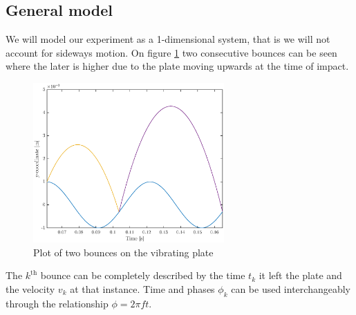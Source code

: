 \documentclass[12pt,oneside,a4paper]{article}
\numberwithin{equation}{section}
\begin{document}
{{{{\subsection{General model}
We will model our experiment as a 1-dimensional system, that is we will not 
account for sideways motion. On figure \ref{bounces} two consecutive bounces 
can be seen where the later is higher due to the plate  moving upwards at the 
time of impact.
\begin{figure}[h]
	\centering
	\includegraphics[width=0.65\textwidth]{Figures/bounceplot.eps}
	\caption{Plot of two bounces on the vibrating plate}
	\label{bounces}
\end{figure}
The $k^{\text{th}}$ bounce can be completely described by the time $t_k$ it left the plate and the velocity $v_k$ at that instance. Time and phases $\phi_k$ can be used interchangeably through the relationship $\phi=2\pi f t$.

}}}}
\end{document}
